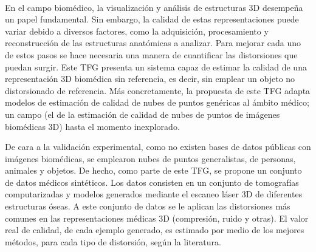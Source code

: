\chapter*{}


% 


\thispagestyle{empty}

\begin{center}
{\large\bfseries \myTitle}\\
\end{center}
\begin{center}
\myName\\
\end{center}

\\

\\
En el campo biomédico, la visualización y análisis de estructuras 3D
desempeña un papel fundamental. 
Sin embargo, la calidad de estas representaciones puede variar debido a diversos 
factores, como la adquisición, procesamiento y reconstrucción de las estructuras anatómicas a analizar. 
Para mejorar cada uno de estos pasos se hace necesaria una manera de cuantificar las distorsiones que puedan surgir. 
Este TFG presenta un sistema capaz de estimar la calidad de 
una representación 3D biomédica sin referencia, es decir, sin emplear un objeto 
no distorsionado de referencia. 
Más concretamente, la propuesta de este TFG
adapta modelos de estimación de calidad de nubes de puntos genéricas 
al ámbito médico; 
un campo (el de la estimación de calidad de nubes de puntos 
de imágenes biomédicas 3D) hasta el momento inexplorado. 
\smallskip

De cara a la validación experimental, como no existen bases de datos públicas con imágenes 
biomédicas, se emplearon nubes de puntos generalistas, de personas, animales y objetos. 
De hecho, como parte de este TFG, se propone un conjunto de datos médicos sintéticos.
Los datos consisten en un conjunto de tomografías computarizadas y modelos 
generados mediante el escaneo láser 3D de diferentes estructuras óseas. 
A este conjunto de datos se le aplican las distorsiones más comunes 
en las representaciones médicas 3D (compresión, ruido y otras). 
El valor real de calidad, de cada ejemplo generado, es estimado por medio de 
los mejores métodos, para cada tipo de distorsión, según la literatura. 
\smallskip

